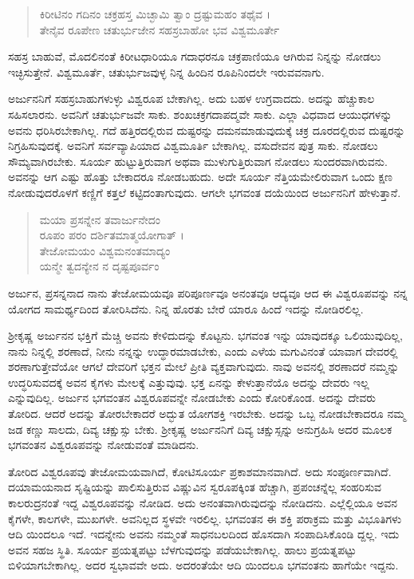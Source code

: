 \begin{verse}
ಕಿರೀಟಿನಂ ಗದಿನಂ ಚಕ್ರಹಸ್ತ ಮಿಚ್ಛಾಮಿ ತ್ವಾಂ ದ್ರಷ್ಟುಮಹಂ ತಥೈವ ।\\ತೇನೈವ ರೂಪೇಣ ಚತುರ್ಭುಜೇನ ಸಹಸ್ರಬಾಹೋ ಭವ ವಿಶ್ವಮೂರ್ತೇ 
\end{verse}

ಸಹಸ್ರ ಬಾಹುವೆ, ಮೊದಲಿನಂತೆ ಕಿರೀಟಧಾರಿಯೂ ಗದಾಧರನೂ ಚಕ್ರಪಾಣಿಯೂ ಆಗಿರುವ ನಿನ್ನನ್ನು ನೋಡಲು ಇಚ್ಛಿಸುತ್ತೇನೆ. ವಿಶ್ವಮೂರ್ತೆ, ಚತುರ್ಭುಜವುಳ್ಳ ನಿನ್ನ ಹಿಂದಿನ ರೂಪಿನಿಂದಲೇ ಇರುವವನಾಗು.

ಅರ್ಜುನನಿಗೆ ಸಹಸ್ರಬಾಹುಗಳುಳ್ಳು ವಿಶ್ವರೂಪ ಬೇಕಾಗಿಲ್ಲ. ಅದು ಬಹಳ ಉಗ್ರವಾದದು. ಅದನ್ನು ಹೆಚ್ಚುಕಾಲ ಸಹಿಸಲಾರನು. ಅವನಿಗೆ ಚತುರ್ಭುಜವೇ ಸಾಕು. ಶಂಖಚಕ್ರಗದಾಪದ್ಮವೇ ಸಾಕು. ಎಲ್ಲಾ ವಿಧವಾದ ಆಯುಧಗಳನ್ನು ಅವನು ಧರಿಸಿರಬೇಕಾಗಿಲ್ಲ. ಗದೆ ಹತ್ತಿರದಲ್ಲಿರುವ ದುಷ್ಟರನ್ನು ದಮನಮಾಡುವುದುಕ್ಕೆ ಚಕ್ರ ದೂರದಲ್ಲಿರುವ ದುಷ್ಟರನ್ನು ನಿಗ್ರಹಿಸುವುದಕ್ಕೆ. ಅವನಿಗೆ ಸರ್ವವ್ಯಾಪಿಯಾದ ವಿಶ್ವಮೂರ್ತಿ ಬೇಕಾಗಿಲ್ಲ. ವಸುದೇವನ ಪುತ್ರ ಸಾಕು. ನೋಡಲು ಸೌಮ್ಯವಾಗಿರಬೇಕು. ಸೂರ್ಯ ಹುಟ್ಟುತ್ತಿರುವಾಗ ಅಥವಾ ಮುಳುಗುತ್ತಿರುವಾಗ ನೋಡಲು ಸುಂದರವಾಗಿರುವನು. ಅವನನ್ನು ಆಗ ಎಷ್ಟು ಹೊತ್ತು ಬೇಕಾದರೂ ನೋಡಬಹುದು. ಅದೇ ಸೂರ್ಯ ನೆತ್ತಿಯಮೇಲಿರುವಾಗ ಒಂದು ಕ್ಷಣ ನೋಡುವುದರೊಳಗೆ ಕಣ್ಣಿಗೆ ಕತ್ತಲೆ ಕಟ್ಟಿದಂತಾಗುವುದು. ಆಗಲೇ ಭಗವಂತ ದಯೆಯಿಂದ ಅರ್ಜುನನಿಗೆ ಹೇಳುತ್ತಾನೆ.

\begin{verse}
ಮಯಾ ಪ್ರಸನ್ನೇನ ತವಾರ್ಜುನೇದಂ \\ ರೂಪಂ ಪರಂ ದರ್ಶಿತಮಾತ್ಮಯೋಗಾತ್ ।\\ತೇಜೋಮಯಂ ವಿಶ್ವಮನಂತಮಾದ್ಯಂ \\ ಯನ್ಮೇ ತ್ವದನ್ಯೇನ ನ ದೃಷ್ಟಪೂರ್ವಂ 
\end{verse}

{\small ಅರ್ಜುನ, ಪ್ರಸನ್ನನಾದ ನಾನು ತೇಜೋಮಯವೂ ಪರಿಪೂರ್ಣವೂ ಅನಂತವೂ ಆದ್ಯವೂ ಆದ ಈ ವಿಶ್ವರೂಪವನ್ನು ನನ್ನ ಯೋಗದ ಸಾಮರ್ಥ್ಯದಿಂದ ತೋರಿಸಿದೆನು. ನಿನ್ನ ಹೊರತು ಬೇರೆ ಯಾರೂ ಹಿಂದೆ ಇದನ್ನು ನೋಡಿರಲಿಲ್ಲ.}

ಶ್ರೀಕೃಷ್ಣ ಅರ್ಜುನನ ಭಕ್ತಿಗೆ ಮೆಚ್ಚಿ ಅವನು ಕೇಳಿದುದನ್ನು ಕೊಟ್ಟನು. ಭಗವಂತ ಇನ್ನು ಯಾವುದಕ್ಕೂ ಒಲಿಯುವುದಿಲ್ಲ, ನಾನು ನಿನ್ನಲ್ಲಿ ಶರಣಾದೆ, ನೀನು ನನ್ನನ್ನು ಉದ್ಧಾರಮಾಡಬೇಕು, ಎಂದು ಎಳೆಯ ಮಗುವಿನಂತೆ ಯಾವಾಗ ದೇವರಲ್ಲಿ ಶರಣಾಗುತ್ತೇವೆಯೋ ಆಗಲೆ ದೇವರಿಗೆ ಭಕ್ತನ ಮೇಲೆ ಪ್ರೀತಿ ವ್ಯಕ್ತವಾಗುವುದು. ನಾವು ಅವನಲ್ಲಿ ಶರಣಾದರೆ ನಮ್ಮನ್ನು ಉದ್ಧರಿಸುವದಕ್ಕೆ ಅವನ ಕೈಗಳು ಮೇಲಕ್ಕೆ ಎತ್ತುವುವು. ಭಕ್ತ ಏನನ್ನು ಕೇಳುತ್ತಾನೆಯೊ ಅದನ್ನು ದೇವರು ಇಲ್ಲ ಎನ್ನುವುದಿಲ್ಲ. ಅರ್ಜುನ ಭಗವಂತನ ವಿಶ್ವರೂಪವನ್ನೇ ನೋಡಬೇಕು ಎಂದು ಕೋರಿಕೊಂಡ. ಅದನ್ನು ದೇವರು ತೋರಿದ. ಆದರೆ ಅದನ್ನು ತೋರಬೇಕಾದರೆ ಅದ್ಭುತ ಯೋಗಶಕ್ತಿ ಇರಬೇಕು. ಅದನ್ನು ಒಬ್ಬ ನೋಡಬೇಕಾದರೂ ನಮ್ಮ ಜಡ ಕಣ್ಣು ಸಾಲದು, ದಿವ್ಯ ಚಕ್ಷುಸ್ಸು ಬೇಕು. ಶ್ರೀಕೃಷ್ಣ ಅರ್ಜುನನಿಗೆ ದಿವ್ಯ ಚಕ್ಷುಸ್ಸನ್ನು ಅನುಗ್ರಹಿಸಿ ಅದರ ಮೂಲಕ ಭಗವಂತನ ವಿಶ್ವರೂಪವನ್ನು ನೋಡುವಂತೆ ಮಾಡಿದನು.

ತೋರಿದ ವಿಶ್ವರೂಪವು ತೇಜೋಮಯವಾಗಿದೆ, ಕೋಟಿಸೂರ್ಯ ಪ್ರಕಾಶಮಾನವಾಗಿದೆ. ಅದು ಸಂಪೂರ್ಣವಾಗಿದೆ. ದಯಾಮಯನಾದ ಸೃಷ್ಟಿಯನ್ನು ಪಾಲಿಸುತ್ತಿರುವ ವಿಷ್ಣುವಿನ ಸ್ವರೂಪಕ್ಕಿಂತ ಹೆಚ್ಚಾಗಿ, ಪ್ರಪಂಚನ್ನೆಲ್ಲ ಸಂಹರಿಸುವ ಕಾಲರುದ್ರನಂತೆ ಇದ್ದ ವಿಶ್ವರೂಪವನ್ನು ನೋಡಿದ. ಅದು ಅನಂತವಾಗಿರುವುದನ್ನು ನೋಡಿದನು. ಎಲ್ಲೆಲ್ಲಿಯೂ ಅವನ ಕೈಗಳೇ, ಕಾಲಗಳೇ, ಮುಖಗಳೇ. ಅವನಿಲ್ಲದ ಸ್ಥಳವೇ ಇರಲಿಲ್ಲ. ಭಗವಂತನ ಈ ಶಕ್ತಿ ಪರಾಕ್ರಮ ಮತ್ತು ವಿಭೂತಿಗಳು ಆದಿ ಯಿಂದಲೂ ಇದೆ. ಇದನ್ನೇನು ಅವನು ನಮ್ಮಂತೆ ಸಾಧನಬಲದಿಂದ ಹೊಸದಾಗಿ ಸಂಪಾದಿಸಿಕೊಂಡಿ ದ್ದಲ್ಲ. ಇದು ಅವನ ಸಹಜ ಸ್ಥಿತಿ. ಸೂರ್ಯ ಪ್ರಯತ್ನಪಟ್ಟು ಬೆಳಗುವುದನ್ನು ಪಡೆಯಬೇಕಾಗಿಲ್ಲ. ಹಾಲು ಪ್ರಯತ್ನಪಟ್ಟು ಬಿಳಿಯಾಗಬೇಕಾಗಿಲ್ಲ. ಅದರ ಸ್ವಭಾವವೇ ಅದು. ಅದರಂತೆಯೇ ಆದಿ ಯಿಂದಲೂ ಭಗವಂತನು ಹಾಗೆಯೇ ಇದ್ದನು.

